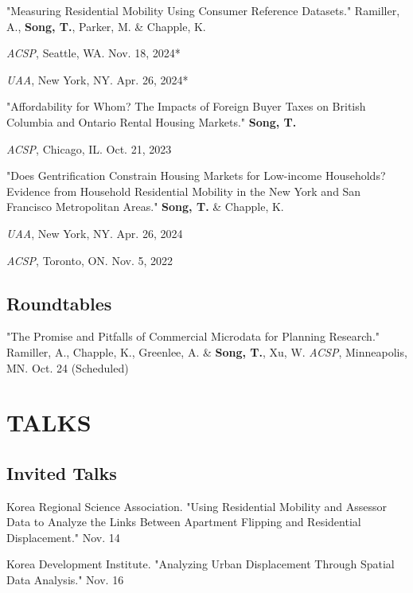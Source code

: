 \documentclass[11pt,letterpaper]{report}
\newcommand{\listitemspace}{0.4em}
\renewenvironment{itemize}
{\begin{list}{}{\setlength{\leftmargin}{0.5em}
\setlength{\parskip}{0em}
\setlength{\itemsep}{\listitemspace}
\setlength{\parsep}{\listitemspace}}}
{\end{list}}
\begin{document}
\begin{itemize}
\item "Measuring Residential Mobility Using Consumer Reference Datasets." Ramiller, A., \textbf{Song, T.}, Parker, M. \& Chapple, K. 
\begin{itemize}
\addtolength{\leftskip}{1em} 
\setlength{\itemsep}{-0.4em}
\item[•] \emph{ACSP}, Seattle, WA. Nov. 18, 2024*
\item[•] \emph{UAA}, New York, NY. Apr. 26, 2024*
\end{itemize}

\item "Affordability for Whom? The Impacts of Foreign Buyer Taxes on British Columbia and Ontario Rental Housing Markets." \textbf{Song, T.} 
\begin{itemize}
\addtolength{\leftskip}{1em} 
\setlength{\itemsep}{-0.4em}
\item[•] \emph{ACSP}, Chicago, IL. Oct. 21, 2023
\end{itemize}

\item "Does Gentrification Constrain Housing Markets for Low-income Households? Evidence from Household Residential Mobility in the New York and San Francisco Metropolitan Areas." \textbf{Song, T.} \& Chapple, K. 
\begin{itemize}
\addtolength{\leftskip}{1em} 
\setlength{\itemsep}{-0.4em}
\item[•] \emph{UAA}, New York, NY. Apr. 26, 2024
\item[•] \emph{ACSP}, Toronto, ON. Nov. 5, 2022
\end{itemize}

\end{itemize}

\subsection*{Roundtables}

\begin{tablist}
\item[2025] \tab{}"The Promise and Pitfalls of Commercial Microdata for Planning Research." Ramiller, A., Chapple, K., Greenlee, A. \& \textbf{Song, T.}, Xu, W. \emph{ACSP}, Minneapolis, MN. Oct. 24 (Scheduled)
\end{tablist}

\section*{TALKS}
\subsection*{Invited Talks}
\begin{tablist}
\item[2024] \tab{}Korea Regional Science Association. "Using Residential Mobility and Assessor Data to Analyze the Links Between Apartment Flipping and Residential Displacement." Nov. 14
\item[2022] \tab{}Korea Development Institute. "Analyzing Urban Displacement Through Spatial Data Analysis." Nov. 16
\end{tablist}
\end{document}
